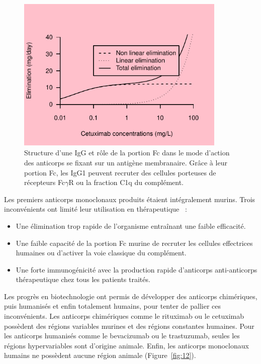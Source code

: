 \begin{figure}[htbp]
	\centering
		\includegraphics[width=10cm]{images/essai001.pdf}
	\caption[Structure d'une IgG et rôle de la portion Fc.]{Structure d'une IgG et rôle de la portion Fc dans le mode d'action des anticorps se fixant sur un antigène membranaire. Grâce à leur portion Fc, les IgG1 peuvent recruter des cellules porteuses de récepteurs Fc$\gamma$R ou la fraction C1q du complément.}
	\label{fig:11}
\end{figure}

Les premiers anticorps monoclonaux produits étaient intégralement murins. Trois inconvénients ont limité leur utilisation en thérapeutique~\citep{REF17} :
\begin{itemize}
\item Une élimination trop rapide de l'organisme entraînant une faible efficacité.
\item Une faible capacité de la portion Fc murine de recruter les cellules effectrices humaines ou d'activer la voie classique du complément.
\item Une forte immunogénicité avec la production rapide d'anticorps anti-anticorps thérapeutique chez tous les patients traités.
\end{itemize}
Les progrès en biotechnologie ont permis de développer des anticorps chimériques, puis humanisés et enfin totalement humains, pour tenter de pallier ces inconvénients. Les anticorps chimériques comme le rituximab ou le cetuximab possèdent des régions variables murines et des régions constantes humaines. Pour les anticorps humanisés comme le bevacizumab ou le trastuzumab, seules les régions hypervariables sont d'origine animale. Enfin, les anticorps monoclonaux humains ne possèdent aucune région animale (Figure~\ref{fig:12}).

